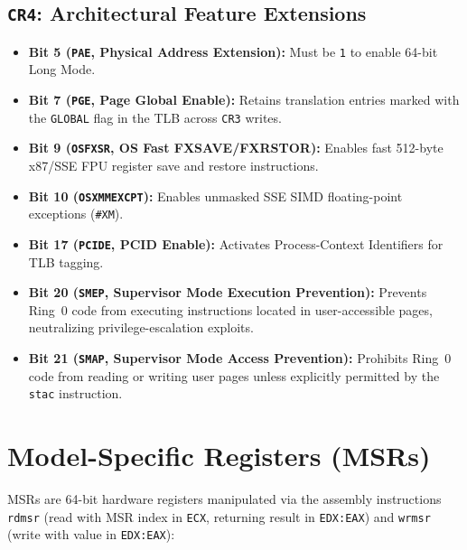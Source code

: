 \subsection{\texttt{CR4}: Architectural Feature Extensions}
\begin{itemize}
    \item \textbf{Bit 5 (\texttt{PAE}, Physical Address Extension):} Must be \texttt{1} to enable 64-bit Long Mode.
    \item \textbf{Bit 7 (\texttt{PGE}, Page Global Enable):} Retains translation entries marked with the \texttt{GLOBAL} flag in the TLB across \texttt{CR3} writes.
    \item \textbf{Bit 9 (\texttt{OSFXSR}, OS Fast FXSAVE/FXRSTOR):} Enables fast 512-byte x87/SSE FPU register save and restore instructions.
    \item \textbf{Bit 10 (\texttt{OSXMMEXCPT}):} Enables unmasked SSE SIMD floating-point exceptions (\texttt{\#XM}).
    \item \textbf{Bit 17 (\texttt{PCIDE}, PCID Enable):} Activates Process-Context Identifiers for TLB tagging.
    \item \textbf{Bit 20 (\texttt{SMEP}, Supervisor Mode Execution Prevention):} Prevents Ring~0 code from executing instructions located in user-accessible pages, neutralizing privilege-escalation exploits.
    \item \textbf{Bit 21 (\texttt{SMAP}, Supervisor Mode Access Prevention):} Prohibits Ring~0 code from reading or writing user pages unless explicitly permitted by the \texttt{stac} instruction.
\end{itemize}

\section{Model-Specific Registers (MSRs)}
\label{sec:msr_deep}

MSRs are 64-bit hardware registers manipulated via the assembly instructions \texttt{rdmsr} (read with MSR index in \texttt{ECX}, returning result in \texttt{EDX:EAX}) and \texttt{wrmsr} (write with value in \texttt{EDX:EAX}):

